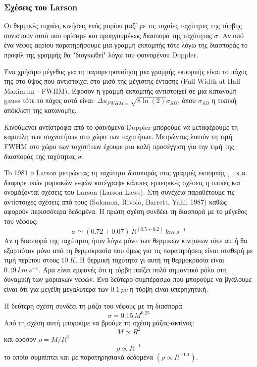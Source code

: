 \documentclass[a4paper,12pt]{memoir}
\begin{document}
\subsubsection{Σχέσεις του Larson}
\label{par:LarsonLaws}
Οι θερμικές τυχαίες κινήσεις ενός μορίου μαζί με τις τυχαίες ταχύτητες της τύρβης συνιστούν αυτό που ορίσαμε και προηγουμένως διασπορά της ταχύτητας $\sigma$. Αν από ένα νέφος αερίου παρατηρήσουμε μια γραμμή εκπομπής τότε λόγω της διασποράς το προφίλ της γραμμής θα "διογκωθεί" λόγω του φαινομένου Doppler. 

Ένα χρήσιμο μέγεθος για τη παραμετροποίηση μια γραμμής εκπομπής είναι το πάχος της στο ύψος που αντιστοιχεί στο μισό της μέγιστης έντασης (Full Width at Half Maximum - FWHM). Εφόσον η γραμμή εκπομπής αντιστοιχεί σε μια κατανομή gauss τότε το πάχος αυτό είναι: $\Delta u _{FWHM = }\sqrt{8 \ln(2)} \sigma _{SD}$, όπου $\sigma _{SD}$ η τυπική απόκλιση της κατανομής. 

Κινούμενοι αντίστροφα από το φαινόμενο Doppler μπορούμε να μεταφέρουμε τη καμπύλη των συχνοτήτων στο χώρο των ταχυτήτων. Μετρώντας λοιπόν τη τιμή FWHM στο χώρο των ταχυτήτων έχουμε μια καλή προσέγγιση για την τιμή της διασποράς της ταχύτητας $\sigma$.

To 1981 ο Larson μετρώντας τη ταχύτητα διασποράς στις γραμμές εκπομπής , ,  κ.α. διαφορετικών μοριακών νεφών κατέγραψε κάποιες εμπειρικές σχέσεις η οποίες και ονομάζονται σχέσεις του Larson (Larson Laws). Στη συνέχεια παραθέτουμε τις αντίστοιχες σχέσεις από τους (Solomon, Rivolo, Barrett, Yahil 1987) καθώς αφορούν περισσότερα δεδομένα.
Η πρώτη σχέση συνδέει τη διασπορά με το μέγεθος του νέφους:
\begin{equation}
\label{eq:LarsonR}
\sigma \simeq (0.72 \pm 0.07)\, R^{(0.5 \pm 0.2)} \ km\, s^{-1}
\end{equation} 
Αν η διασπορά της ταχύτητας ήταν λόγω μόνο των θερμικών κινήσεων τότε αυτή θα εξαρτιόταν μόνο από τη θερμοκρασία που όμως για τις παρατηρήσεις είναι σταθερή με τιμή περίπου στους $10 \ K$. Η θερμική ταχύτητα γι αυτή τη θερμοκρασία είναι $0.19\ km\, s^{-1}$.
Άρα είναι εμφανές ότι η τύρβη παίζει πολύ σημαντικό ρόλο στη δυναμική των μοριακών νεφών. Ένα δεύτερο συμπέρασμα που μπορούμε να βγάλουμε είναι ότι για μεγέθη μεγαλύτερα των $0.1 \ pc$ η τύρβη είναι υπερηχητική.

Η δεύτερη σχέση συνδέει τη μάζα του νέφους με τη διασπορά:
\begin{equation}
\label{eq:LarsonM}
\sigma = 0.15\, M^{0.25}
\end{equation}
Από τη σχέση αυτή μπορούμε να βρούμε τη σχέση μάζας-ακτίνας:
\begin{equation}
M\propto R^2
\end{equation}
και εφόσον $\rho = M/R^3$
\begin{equation}
\label{eq:Larsonrho}
\rho \propto R^{-1}
\end{equation}
το οποίο συμπίπτει και με παρατηρησιακά δεδομένα $(\rho \propto R^{-1.1})$.
\medskip
\end{document}
